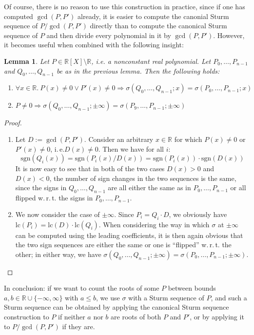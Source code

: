 \documentclass[11pt,a4paper,oneside]{article}
\newtheorem{lemma}[definition]{Lemma}
\newcommand{\RR}{\mathbb{R}}
\newcommand{\ie}{i.\,e.\xspace}
\newcommand{\wrt}{w.\,r.\,t.\xspace}
\begin{document}
Of course, there is no reason to use this construction in practice, since if one has computed $\gcd(P,P')$ already, it is easier to compute the canonial Sturm sequence of $P/\gcd(P,P')$ directly than to compute the canonical Sturm sequence of $P$ and then divide every polynomial in it by $\gcd(P,P')$. However, it becomes useful when combined with the following insight:
\begin{lemma}\label{thm:sturm_multiple_aux2}
Let $P\in\RR[X]\setminus\RR$, i.e. a nonconstant real polynomial. Let $P_0, \ldots, P_{n-1}$ and $Q_0,\ldots, Q_{n-1}$ be as in the previous lemma. Then the following holds:
\begin{enumerate}
\item $\forall x\in\RR.\ P(x)\neq 0\vee P'(x)\neq 0 \Longrightarrow \sigma(Q_0, \ldots, Q_{n-1}; x) = \sigma(P_0, \ldots, P_{n-1}; x)$
\item $P\neq 0 \Longrightarrow \sigma(Q_0,\ldots,Q_{n-1}; \pm\infty) = \sigma(P_9,\ldots,P_{n-1};\pm\infty)$
\end{enumerate}
\end{lemma}
\begin{proof}\ 
\begin{enumerate}
\item Let $D:=\gcd(P,P')$. Consider an arbitrary $x\in\RR$ for which $P(x)\neq 0$ or $P'(x)\neq 0$, \ie $D(x)\neq 0$. Then we have for all $i$:
$$\mathrm{sgn}(Q_i(x)) = \mathrm{sgn}(P_i(x) / D(x)) = \mathrm{sgn}(P_i(x)) \cdot \mathrm{sgn}(D(x))$$
It is now easy to see that in both of the two cases $D(x)>0$ and $D(x)<0$, the number of sign changes in the two sequences is the same, since the signs in $Q_0,\ldots, Q_{n-1}$ are all either the same as in $P_0,\ldots, P_{n-1}$ or all flipped \wrt the signs in $P_0,\ldots,P_{n-1}$.
\item We now consider the case of $\pm\infty$. Since $P_i = Q_i\cdot D$, we obviously have $\mathrm{lc}(P_i) = \mathrm{lc}(D)\cdot \mathrm{lc}(Q_i)$. When considering the way in which $\sigma$ at $\pm\infty$ can be computed using the leading coefficients, it is then again obvious that the two sign sequences are either the same or one is \enquote{flipped} \wrt the other; in either way, we have $\sigma(Q_0,\ldots,Q_{n-1};\pm\infty) = \sigma(P_0,\ldots,P_{n-1};\pm\infty)$.
\end{enumerate}
\end{proof}

In conclusion: if we want to count the roots of some $P$ between bounds $a,b\in\RR\cup\{-\infty,\infty\}$ with $a\leq b$, we use $\sigma$ with a Sturm sequence of $P$, and such a Sturm sequence can be obtained by applying the canonical Sturm sequence construction to $P$ if neither $a$ nor $b$ are roots of both $P$ and $P'$, or by applying it to $P/\gcd(P,P')$ if they are.
\end{document}
